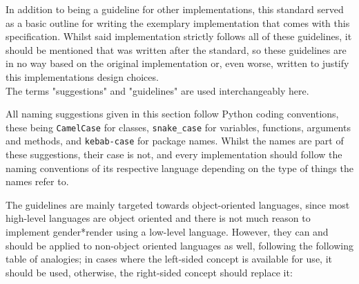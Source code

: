 \documentclass{article}
\newcommand{\GenderRender}{
    gender*render
}
\newcounter{subsubsubsection}[subsubsection]
\begin{document}
    In addition to being a guideline for other implementations, this standard served as a basic outline for writing the exemplary implementation that comes with this specification.
    Whilst said implementation strictly follows all of these guidelines, it should be mentioned that was written after the standard, so these guidelines are in no way based on the original implementation or, even worse, written to justify this implementations design choices.\\

    The terms "suggestions" and "guidelines" are used interchangeably here.


    All naming suggestions given in this section follow Python coding conventions, these being \texttt{CamelCase} for classes, \texttt{snake\_case} for variables, functions, arguments and methods, and \texttt{kebab-case} for package names.
    Whilst the names are part of these suggestions, their case is not, and every implementation should follow the naming conventions of its respective language depending on the type of things the names refer to.


    The guidelines are mainly targeted towards object-oriented languages, since most high-level languages are object oriented and there is not much reason to implement \GenderRender using a low-level language.
    However, they can and should be applied to non-object oriented languages as well, following the following table of analogies;
    in cases where the left-sided concept is available for use, it should be used, otherwise, the right-sided concept should replace it:
\end{document}
